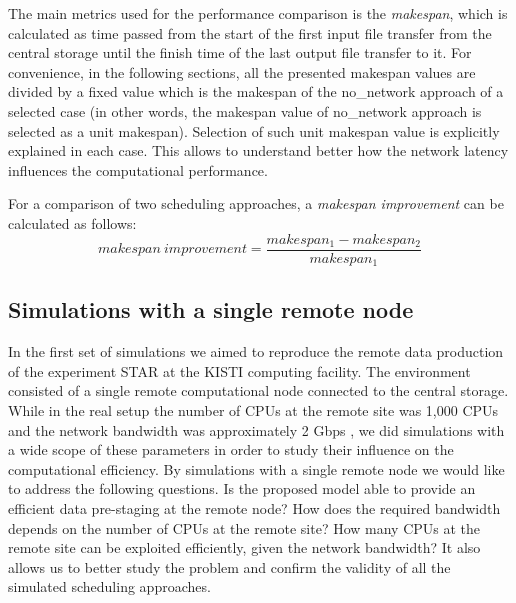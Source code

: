 \documentclass{svjour3}                     %
\begin{document}
The main metrics used for the performance comparison is the \textit{makespan}, which is calculated as time passed from the start of the first input file transfer from the central storage until the finish time of the last output file transfer to it. For convenience, in the following sections, all the presented makespan values are divided by a fixed value which is the makespan of the no\_network approach of a selected case (in other words, the makespan value of no\_network approach is selected as a unit makespan). Selection of such unit makespan value is explicitly explained in each case. This allows to understand better how the network latency influences the computational performance.

For a comparison of two scheduling approaches, a \textit{makespan improvement} can be calculated as follows:
\begin{equation}
\label{makespanImprovement}
 makespan~improvement = \frac{makespan_{1} - makespan_{2}}{makespan_{1}} 
\end{equation}


\subsection{Simulations with a single remote node}
\label{1nodeSim}
In the first set of simulations we aimed to reproduce the remote data production of the experiment STAR at the KISTI computing facility. The environment consisted of a single remote computational node connected to the central storage. While in the real setup the number of CPUs at the remote site was 1,000 CPUs and the network bandwidth was approximately 2 Gbps \cite{KISTI-production}, we did simulations with a wide scope of these parameters in order to study their influence on the computational efficiency. By simulations with a single remote node we would like to address the following questions. Is the proposed model able to provide an efficient data pre-staging at the remote node? How does the required bandwidth depends on the number of CPUs at the remote site? How many CPUs at the remote site can be exploited efficiently, given the network bandwidth? It also allows us to better study the problem and confirm the validity of all the simulated scheduling approaches.

\end{document}
